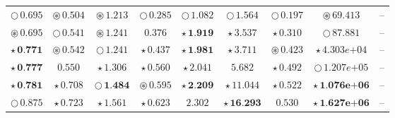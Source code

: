 \documentclass[
]{article}
\begin{document}
\begin{table}[!h]
\begin{tabular}[t]{ccccccccc}
\cellcolor[HTML]{2297E6}$\bigcirc\,\textit{0.695}$ & \cellcolor[HTML]{2297E6}$\circledast\,\textit{0.504}$ & \cellcolor[HTML]{DF536B}$\circledast\,\textit{1.213}$ & \cellcolor[HTML]{F5C710}$\bigcirc\,\textit{0.285}$ & \cellcolor[HTML]{F5C710}$\bigcirc\,\textit{1.082}$ & \cellcolor[HTML]{F5C710}$\bigcirc\,\textit{1.564}$ & \cellcolor[HTML]{F5C710}$\bigcirc\,\textit{0.197}$ & \cellcolor[HTML]{2297E6}$\circledast\,\textit{69.413}$ & --\\
\cellcolor[HTML]{2297E6}$\circledast\,\textit{0.695}$ & \cellcolor[HTML]{DF536B}$\bigcirc\,\textit{0.541}$ & \cellcolor[HTML]{F5C710}$\circledast\,\textit{1.241}$ & \cellcolor[HTML]{FFFFFF}$0.376$ & \cellcolor[HTML]{DF536B}$\star\,\textbf{1.919}$ & \cellcolor[HTML]{2297E6}$\star\,\textit{3.537}$ & \cellcolor[HTML]{F5C710}$\star\,\textit{0.310}$ & \cellcolor[HTML]{2297E6}$\bigcirc\,\textit{87.881}$ & --\\
\cellcolor[HTML]{F5C710}$\star\,\textbf{0.771}$ & \cellcolor[HTML]{DF536B}$\circledast\,\textit{0.542}$ & \cellcolor[HTML]{DF536B}$\bigcirc\,\textit{1.241}$ & \cellcolor[HTML]{F5C710}$\star\,\textit{0.437}$ & \cellcolor[HTML]{2297E6}$\star\,\textbf{1.981}$ & \cellcolor[HTML]{DF536B}$\star\,\textit{3.711}$ & \cellcolor[HTML]{F5C710}$\circledast\,\textit{0.423}$ & \cellcolor[HTML]{F5C710}$\star\,\textit{4.303e+04}$ & --\\
\cellcolor[HTML]{DF536B}$\star\,\textbf{0.777}$ & \cellcolor[HTML]{FFFFFF}$0.550$ & \cellcolor[HTML]{F5C710}$\star\,\textit{1.306}$ & \cellcolor[HTML]{2297E6}$\star\,\textit{0.560}$ & \cellcolor[HTML]{F5C710}$\star\,\textit{2.041}$ & \cellcolor[HTML]{FFFFFF}$5.682$ & \cellcolor[HTML]{2297E6}$\star\,\textit{0.492}$ & \cellcolor[HTML]{F5C710}$\bigcirc\,\textit{1.207e+05}$ & --\\
\cellcolor[HTML]{2297E6}$\star\,\textbf{0.781}$ & \cellcolor[HTML]{2297E6}$\star\,\textit{0.708}$ & \cellcolor[HTML]{DF536B}$\bigcirc\,\textbf{1.484}$ & \cellcolor[HTML]{F5C710}$\circledast\,\textit{0.595}$ & \cellcolor[HTML]{F5C710}$\star\,\textbf{2.209}$ & \cellcolor[HTML]{F5C710}$\star\,\textit{11.044}$ & \cellcolor[HTML]{DF536B}$\star\,\textit{0.522}$ & \cellcolor[HTML]{DF536B}$\star\,\textbf{1.076e+06}$ & --\\
\cellcolor[HTML]{DF536B}$\bigcirc\,\textit{0.875}$ & \cellcolor[HTML]{DF536B}$\star\,\textit{0.723}$ & \cellcolor[HTML]{2297E6}$\star\,\textit{1.561}$ & \cellcolor[HTML]{DF536B}$\star\,\textit{0.623}$ & \cellcolor[HTML]{FFFFFF}$2.302$ & \cellcolor[HTML]{2297E6}$\star\,\textbf{16.293}$ & \cellcolor[HTML]{FFFFFF}$0.530$ & \cellcolor[HTML]{2297E6}$\star\,\textbf{1.627e+06}$ & --\\

\end{tabular}
\end{table}
\end{document}
